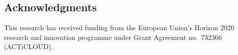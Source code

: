 \documentclass{cidr-2019}
\begin{document}




\subsection*{Acknowledgments} This research has received funding from the European Union's Horizon 2020 research and innovation programme under Grant Agreement no.~732366 (ACTiCLOUD).

{


}
\end{document}
